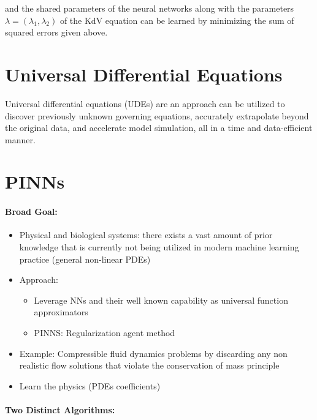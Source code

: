 \documentclass[book.tex]{subfiles}
\begin{document}
and the shared parameters of the neural networks along with the parameters $\lambda = (\lambda_1, \lambda_2)$ of the KdV equation can be learned by minimizing the sum of squared errors given above.


\section{Universal Differential Equations}
Universal differential equations (UDEs) are an approach can be utilized to discover previously unknown governing equations, accurately extrapolate beyond the original data, and accelerate model simulation, all in a time and data-efficient manner.



\section{PINNs}

\paragraph{Broad Goal:}\label{broad-goal}

\begin{itemize}
\itemsep1pt\parskip0pt
\item
  Physical and biological systems: there exists a vast amount of prior
  knowledge that is currently not being utilized in modern machine
  learning practice (general non-linear PDEs)
\item
  Approach:

  \begin{itemize}
  \itemsep1pt\parskip0pt
  \item
    Leverage NNs and their well known capability as universal function
    approximators
  \item
    PINNS: Regularization agent method
  \end{itemize}
\item
  Example: Compressible fluid dynamics problems by discarding any non
  realistic flow solutions that violate the conservation of mass
  principle
\item
  Learn the physics (PDEs coefficients)
\end{itemize}

\paragraph{Two Distinct Algorithms:}\label{two-distinct-algorithms}
\end{document}
